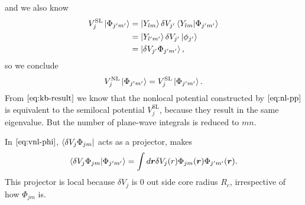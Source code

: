 and we also know
\begin{equation}
	\begin{split}
		V_{j}^\text{SL} \ket{ \Phi_{j'm'} }
		&= \ket{Y_{lm}} \delta V_{j'} \braket{Y_{lm} | \Phi_{j'm'} } \\
		&= \ket{Y_{l'm'}} \delta V_{j'} \ket{\phi_{j'}} \\
		&= \ket{ \delta V_{j'} \Phi_{j'm'} },
	\end{split}
\end{equation}
so we conclude
\begin{equation}\label{eq:kb-result}
	V_j^\text{NL} \ket{\Phi_{j'm'}} = V_{j}^\text{SL} \ket{ \Phi_{j'm'} }.
\end{equation}
From $\eqref{eq:kb-result}$ we know that the nonlocal potential constructed by
$\eqref{eq:nl-pp}$ is equivalent to the semilocal potential $V_{j}^\text{SL}$,
because they result in the same eigenvalue. But the number of
plane-wave integrals is reduced to $mn$.

In $\eqref{eq:vnl-phi}$, $\bra{\delta V_j \Phi_{jm}}$ acts as a projector,\cite{martin2004electronic} makes
\begin{equation}
	\braket{\delta V_j \Phi_{jm} | \Phi_{j'm'} } = \int d\bm{r} \delta V_j (r)
	\Phi_{jm} (\bm{r}) \Phi_{j'm'} (\bm{r}).
\end{equation}
This projector
is local because $\delta V_j$ is $0$ out side core radius $R_c$, irrespective of how $\Phi_{jm}$ is.